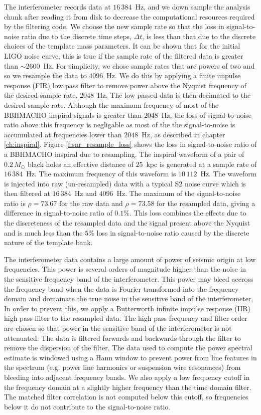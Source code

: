 The interferometer records data at $16\,384$~Hz, and we down sample the
analysis chunk after reading it from disk to decrease the computational
resources required by the filtering code. We choose the new sample rate so
that the loss in signal-to-noise ratio due to the discrete time steps, 
$\Delta t$, is less than that due to the discrete choices of the template mass
parameters. It can be shown that for the initial LIGO noise curve, this is
true if the sample rate of the filtered data is greater than $\sim
2600$~Hz\cite{Owen:1998dk}. For simplicity, we chose sample rates that are
powers of two and so we resample the data to $4096$~Hz.  We do this by
applying a finite impulse response (FIR) low pass filter to remove power above
the Nyquist frequency of the desired sample rate, $2048$~Hz. The low passed
data is then decimated to the desired sample rate. Although the maximum
frequency of most of the BBHMACHO inspiral signals is greater than $2048$~Hz,
the loss of signal-to-noise ratio above this frequency is negligable as most
of the the signal-to-noise is accumulated at frequencies lower than $2048$~Hz,
as described in chapter \ref{ch:inspiral}. Figure \ref{f:snr_resample_loss} shows
the loss in signal-to-noise ratio of a BBHMACHO inspiral due to resampling.
The inspiral waveform of a pair of $0.2\,M_\odot$ black holes an effective
distance of $25$~kpc is generated at a sample rate of $16\,384$~Hz. The
maximum frequency of this waveform is $10\,112$~Hz. The waveform is injected
into raw (un-resampled) data with a typical S2 noise curve which is then
filtered at $16\,384$~Hz and $4096$~Hz. The maximum of the signal-to-noise
ratio is $\rho = 73.67$ for the raw data and $\rho = 73.58$ for the resampled
data, giving a difference in signal-to-noise ratio of $0.1\%$. This loss
combines the effects due to the discreteness of the resampled data and the
signal present above the Nyquist and is much less than the $5\%$ loss in
signal-to-noise ratio caused by the discrete nature of the template bank.

The interferometer data contains a large amount of power of seismic origin at
low frequencies.  This power is several orders of magnitude higher than the
noise in the sensitive frequency band of the interferometer. This power may
bleed accross the frequency band when the data is Fourier transformed into the
frequency domain and domainate the true noise in the sensitive band of the
interferometer, In order to prevent this, we apply a Butterworth infinite
impulse response (IIR) high pass filter to the resampled data. The high pass
frequency and filter order are chosen so that power in the sensitive band of
the interferometer is not attenuated. The data is filtered forwards and
backwards through the filter to remove the dispersion of the filter.  The data
used to compute the power spectral estimate is windowed using a Hann window to
prevent power from line features in the spectrum (e.g. power line harmonics or
suspension wire resonances) from bleeding into adjacent frequency bands.
We also apply a low frequency cutoff in the frequency domain at a slightly
higher frequency than the time domain filter. The matched filter correlation
is not computed below this cutoff, so frequencies below it do not contribute
to the signal-to-noise ratio. 

